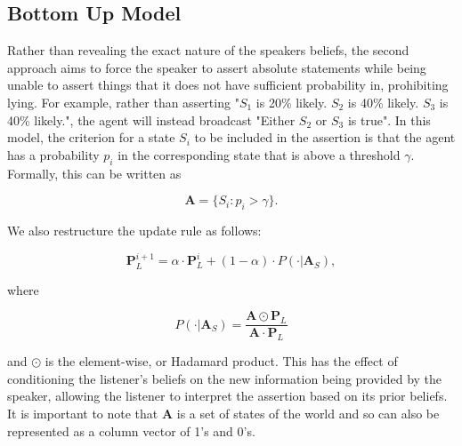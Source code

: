 \subsection{Bottom Up Model}

Rather than revealing the exact nature of the speakers beliefs, the second approach aims to force the speaker to assert absolute statements while being unable to assert things that it does not have sufficient probability in, prohibiting lying. For example, rather than asserting "$S_1$ is 20\% likely. $S_2$ is 40\% likely. $S_3$ is 40\% likely.", the agent will instead broadcast "Either $S_2$ or $S_3$ is true". In this model, the criterion for a state $S_i$ to be included in the assertion is that the agent has a probability $p_i$ in the corresponding state that is above a threshold $\gamma$. Formally, this can be written as 

\begin{equation}\label{eq:BU_approach}
    \mathbf{A} = \{  S_i : p_i > \gamma\}. 
\end{equation}

We also restructure the update rule as follows:

\begin{equation} \label{eq:BU_update_rule}
    \mathbf{P}^{i+1}_L = \alpha \cdot \mathbf{P}^{i}_L + (1 - \alpha) \cdot P(\cdot | \mathbf{A}_S),
\end{equation}

where

\begin{equation}\label{eq:condition_on_p}
     P(\mathbf{\cdot} | \mathbf{A}_S) = \frac{\mathbf{A} \odot \mathbf{P}_L}{\mathbf{A} \cdot \mathbf{P}_L}
\end{equation}

and $\odot$ is the element-wise, or Hadamard product. This has the effect of conditioning the listener's beliefs on the new information being provided by the speaker, allowing the listener to interpret the assertion based on its prior beliefs. It is important to note that $\mathbf{A}$ is a set of states of the world and so can also be represented as a column vector of 1's and 0's. 


